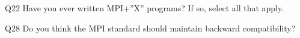 \begin{description}%
\item{Q22} Have you ever written MPI+”X” programs? If so, select all that apply.%
\item{Q28} Do you think the MPI standard should maintain backward compatibility?%
\end{description}%
